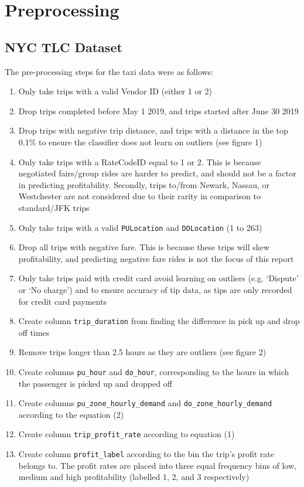 \documentclass[11pt]{article}
\begin{document}
\section{Preprocessing}
\subsection{NYC TLC Dataset}
The pre-processing steps for the taxi data were as follows:
\begin{enumerate} 
    \item Only take trips with a valid Vendor ID (either 1 or 2)
    \item Drop trips completed before May 1 2019, and trips started after June 30 2019
    \item Drop trips with negative trip distance, and trips with a distance in the top 0.1\% to ensure the classifier does not learn on outliers (see figure 1)
    \item Only take trips with a RateCodeID equal to 1 or 2. This is because negotiated fairs/group rides are harder to predict, and should not be a factor in predicting profitability. Secondly, trips to/from Newark, Nassau, or Westchester are not considered due to their rarity in comparison to standard/JFK trips
    \item Only take trips with a valid \verb|PULocation| and \verb|DOLocation| (1 to 263)
    \item Drop all trips with negative fare. This is because these trips will skew profitability, and predicting negative fare rides is not the focus of this report
    \item Only take trips paid with credit card avoid learning on outliers (e.g. ‘Dispute’ or ‘No charge’) and to ensure accuracy of tip data, as tips are only recorded for credit card payments
    \item Create column \verb|trip_duration| from finding the difference in pick up and drop off times 
    \item Remove trips longer than 2.5 hours as they are outliers (see figure 2)
    \item Create columns \verb|pu_hour| and \verb|do_hour|, corresponding to the hours in which the passenger is picked up and dropped off
    \item Create columns \verb|pu_zone_hourly_demand| and \verb|do_zone_hourly_demand| according to the equation (2)
    \item Create column \verb|trip_profit_rate| according to equation (1)
    \item Create column \verb|profit_label| according to the bin the trip’s profit rate belongs to. The profit rates are placed into three equal frequency bins of low, medium and high profitability (labelled 1, 2, and 3 respectively)
\end{enumerate}
\end{document}
